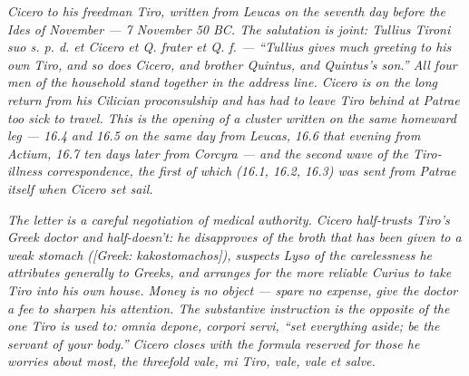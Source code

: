 
\textit{Cicero to his freedman Tiro, written from Leucas on the
seventh day before the Ides of November --- 7 November 50 BC.
The salutation is joint: \textit{Tullius Tironi suo s. p. d. et
Cicero et Q. frater et Q. f.} --- ``Tullius gives much greeting
to his own Tiro, and so does Cicero, and brother Quintus, and
Quintus's son.'' All four men of the household stand together
in the address line. Cicero is on the long return from his
Cilician proconsulship and has had to leave Tiro behind at
Patrae too sick to travel. This is the opening of a cluster
written on the same homeward leg --- 16.4 and 16.5 on the same
day from Leucas, 16.6 that evening from Actium, 16.7 ten days
later from Corcyra --- and the second wave of the Tiro-illness
correspondence, the first of which (16.1, 16.2, 16.3) was sent
from Patrae itself when Cicero set sail.}

\textit{The letter is a careful negotiation of medical
authority. Cicero half-trusts Tiro's Greek doctor and
half-doesn't: he disapproves of the broth that has been given
to a weak stomach (\textit{[Greek: kakostomachos]}), suspects
Lyso of the carelessness he attributes generally to Greeks, and
arranges for the more reliable Curius to take Tiro into his own
house. Money is no object --- spare no expense, give the doctor
a fee to sharpen his attention. The substantive instruction is
the opposite of the one Tiro is used to: \textit{omnia depone,
corpori servi}, ``set everything aside; be the servant of your
body.'' Cicero closes with the formula reserved for those he
worries about most, the threefold \textit{vale, mi Tiro, vale,
vale et salve}.}
